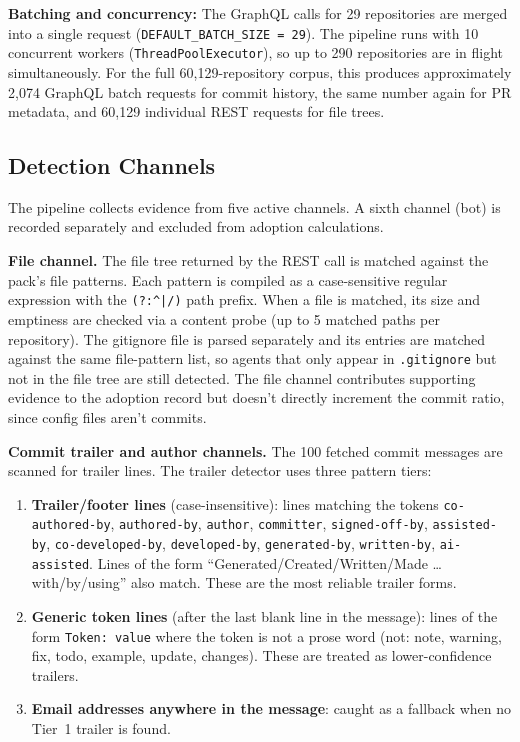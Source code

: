 \textbf{Batching and concurrency:} The GraphQL calls for 29 repositories are merged into a single request (\texttt{DEFAULT\_BATCH\_SIZE = 29}). The pipeline runs with 10 concurrent workers (\texttt{ThreadPoolExecutor}), so up to 290 repositories are in flight simultaneously. For the full 60,129-repository corpus, this produces approximately 2,074 GraphQL batch requests for commit history, the same number again for PR metadata, and 60,129 individual REST requests for file trees.

\subsection{Detection Channels}
\label{sec:impl:detection:channels}

The pipeline collects evidence from five active channels. A sixth channel (bot) is recorded separately and excluded from adoption calculations.

\textbf{File channel.} The file tree returned by the REST call is matched against the pack's file patterns. Each pattern is compiled as a case-sensitive regular expression with the \texttt{(?:\^{}|/)} path prefix. When a file is matched, its size and emptiness are checked via a content probe (up to 5 matched paths per repository). The gitignore file is parsed separately and its entries are matched against the same file-pattern list, so agents that only appear in \texttt{.gitignore} but not in the file tree are still detected. The file channel contributes supporting evidence to the adoption record but doesn't directly increment the commit ratio, since config files aren't commits.

\textbf{Commit trailer and author channels.} The 100 fetched commit messages are scanned for trailer lines. The trailer detector uses three pattern tiers:

\begin{enumerate}
  \item \textbf{Trailer/footer lines} (case-insensitive): lines matching the tokens \texttt{co-authored-by}, \texttt{authored-by}, \texttt{author}, \texttt{committer}, \texttt{signed-off-by}, \texttt{assisted-by}, \texttt{co-developed-by}, \texttt{developed-by}, \texttt{generated-by}, \texttt{written-by}, \texttt{ai-assisted}. Lines of the form ``Generated/Created/Written/Made \ldots with/by/using'' also match. These are the most reliable trailer forms.
  \item \textbf{Generic token lines} (after the last blank line in the message): lines of the form \texttt{Token: value} where the token is not a prose word (not: note, warning, fix, todo, example, update, changes). These are treated as lower-confidence trailers.
  \item \textbf{Email addresses anywhere in the message}: caught as a fallback when no Tier~1 trailer is found.
\end{enumerate}

